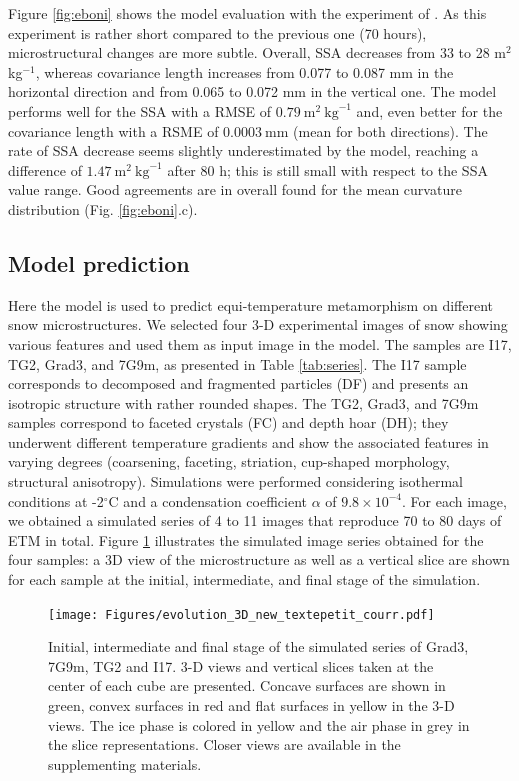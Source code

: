 \documentclass[draft,ms]{agujournal2019}
\begin{document}
Figure \ref{fig:eboni} shows the model evaluation with the experiment of . As this experiment is rather short compared to the previous one (70 hours), microstructural changes are more subtle. Overall, SSA decreases from 33 to 28 m$^2$ kg$^{-1}$, whereas covariance length increases from 0.077 to 0.087 mm in the horizontal direction and from 0.065 to 0.072 mm in the vertical one. The model performs well for the SSA with a RMSE of $0.79\ \mathrm{m}^2\ \mathrm{kg}^{-1}$ and, even better for the covariance length with a RSME of $0.0003\ \mathrm{mm}$ (mean for both directions).
The rate of SSA decrease seems slightly underestimated by the model, reaching a difference of $1.47\ \mathrm{m}^2\ \mathrm{kg}^{-1}$ after 80 h; this is still small with respect to the SSA value range. Good agreements are in overall found for the mean curvature distribution (Fig. \ref{fig:eboni}.c). \\


\subsection{Model prediction}
\label{sec:prediction}

Here the model is used to predict equi-temperature metamorphism on different snow microstructures. We selected four 3-D experimental images of snow showing various features and used them as input image in the model. The samples are I17, TG2, Grad3, and 7G9m, as presented in Table \ref{tab:series}.
The I17 sample corresponds to decomposed and fragmented particles (DF) and presents an isotropic structure with rather rounded shapes. The TG2, Grad3, and 7G9m samples correspond to faceted crystals (FC) and depth hoar (DH); they underwent different temperature gradients and show the associated features in varying degrees (coarsening, faceting, striation, cup-shaped morphology, structural anisotropy). Simulations were performed considering isothermal conditions at -2$^\circ$C and a condensation coefficient $\alpha$ of $9.8\times 10^{-4}$. For each image, we obtained a simulated series of 4 to 11 images that reproduce 70 to 80 days of ETM in total. Figure \ref{fig:evolutions_3D} illustrates the simulated image series obtained for the four samples: a 3D view of the microstructure as well as a vertical slice are shown for each sample at the initial, intermediate, and final stage of the simulation.\\

\begin{figure}
    \centering
    \texttt{[image: Figures/evolution\_3D\_new\_textepetit\_courr.pdf]}
    \caption{Initial, intermediate and final stage of the simulated series of Grad3, 7G9m, TG2 and I17. 3-D views and vertical slices taken at the center of each cube are presented. Concave surfaces are shown in green, convex surfaces in red and flat surfaces in yellow in the 3-D views. The ice phase is colored in yellow and the air phase in grey in the slice representations. Closer views are available in the supplementing materials. }
    \label{fig:evolutions_3D}
\end{figure}
\end{document}
